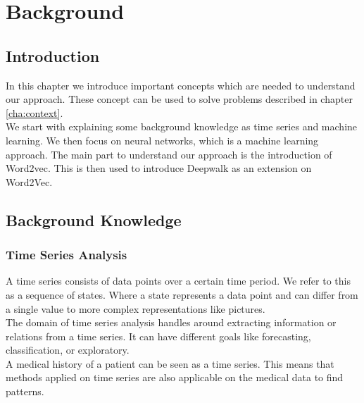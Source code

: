 \graphicspath{ {Background/Images/} }


\chapter{Background}
\label{cha:background}

\section{Introduction}
In this chapter we introduce important concepts which are needed to understand our approach. These concept can be used to solve problems described in chapter \ref{cha:context}. \\

We start with explaining some background knowledge as time series and machine learning. We then focus on neural networks, which is a machine learning approach. The main part to understand our approach is the introduction of Word2vec. This is then used to introduce Deepwalk as an extension on Word2Vec.


\section{Background Knowledge}

	\subsection{Time Series Analysis}
A time series consists of data points over a certain time period. We refer to this as a sequence of states. Where a state represents a data point and can differ from a single value to more complex representations like pictures. \\
The domain of time series analysis handles around extracting information or relations from a time series. It can have different goals like forecasting, classification, or exploratory. \\

A medical history of a patient can be seen as a time series. This means that methods applied on time series are also applicable on the medical data to find patterns.


